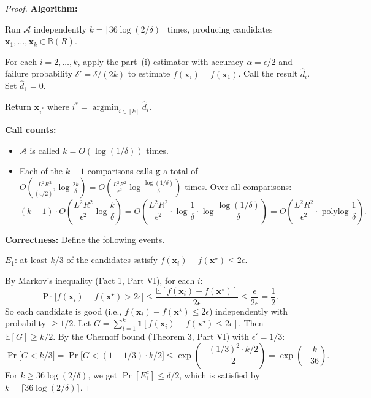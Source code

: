 \begin{proof}
\textbf{Algorithm:}

Run $\mathcal{A}$ independently $k = \lceil 36\log(2/\delta) \rceil$ times, producing candidates $\mathbf{x}_1, \ldots, \mathbf{x}_k \in \mathbb{B}(R)$.

For each $i = 2, \ldots, k$, apply the part~(i) estimator with accuracy $\alpha = \epsilon/2$ and failure probability $\delta' = \delta/(2k)$ to estimate $f(\mathbf{x}_i) - f(\mathbf{x}_1)$. Call the result $\hat{d}_i$. Set $\hat{d}_1 = 0$.

Return $\mathbf{x}_{i^*}$ where $i^* = \operatorname{argmin}_{i \in [k]} \hat{d}_i$.

\medskip
\textbf{Call counts:}
\begin{itemize}
\item $\mathcal{A}$ is called $k = O(\log(1/\delta))$ times.
\item Each of the $k - 1$ comparisons calls $\mathbf{g}$ a total of $O\!\left(\frac{L^2R^2}{(\epsilon/2)^2}\log\frac{2k}{\delta}\right) = O\!\left(\frac{L^2R^2}{\epsilon^2}\log\frac{\log(1/\delta)}{\delta}\right)$ times. Over all comparisons:
\[
(k-1) \cdot O\!\left(\frac{L^2R^2}{\epsilon^2}\log\frac{k}{\delta}\right) = O\!\left(\frac{L^2R^2}{\epsilon^2}\cdot\log\frac{1}{\delta}\cdot\log\frac{\log(1/\delta)}{\delta}\right) = O\!\left(\frac{L^2R^2}{\epsilon^2}\cdot\operatorname{polylog}\frac{1}{\delta}\right).
\]
\end{itemize}

\textbf{Correctness:}
Define the following events.

$E_1$: at least $k/3$ of the candidates satisfy $f(\mathbf{x}_i) - f(\mathbf{x}^\star) \leq 2\epsilon$.

By Markov's inequality (Fact 1, Part VI), for each $i$:
\[
\Pr\bigl[f(\mathbf{x}_i) - f(\mathbf{x}^\star) > 2\epsilon\bigr] \leq \frac{\mathbb{E}[f(\mathbf{x}_i) - f(\mathbf{x}^\star)]}{2\epsilon} \leq \frac{\epsilon}{2\epsilon} = \frac{1}{2}.
\]
So each candidate is good (i.e., $f(\mathbf{x}_i) - f(\mathbf{x}^\star) \leq 2\epsilon$) independently with probability $\geq 1/2$. Let $G = \sum_{i=1}^k \mathbf{1}[f(\mathbf{x}_i) - f(\mathbf{x}^\star) \leq 2\epsilon]$. Then $\mathbb{E}[G] \geq k/2$. By the Chernoff bound (Theorem 3, Part VI) with $\epsilon' = 1/3$:
\[
\Pr\bigl[G < k/3\bigr] = \Pr\bigl[G < (1-1/3) \cdot k/2\bigr] \leq \exp\!\left(-\frac{(1/3)^2 \cdot k/2}{2}\right) = \exp\!\left(-\frac{k}{36}\right).
\]
For $k \geq 36\log(2/\delta)$, we get $\Pr[E_1^c] \leq \delta/2$, which is satisfied by $k = \lceil 36\log(2/\delta) \rceil$.


\end{proof}
